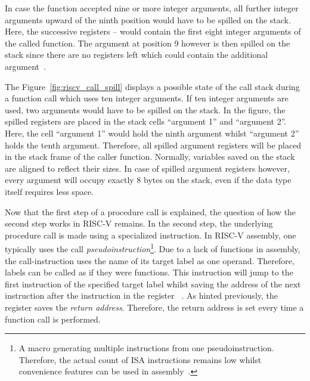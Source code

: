 In case the function accepted nine or more integer arguments,
all further integer arguments upward of the ninth position would have to be spilled on the stack.
Here, the successive registers -- would contain the first eight integer arguments of the called function.
The argument at position 9 however is then spilled on the stack since there are no registers left which could contain the additional argument~\cite[p~.8]{RiscvABI2022}.

The Figure~\ref{fig:riscv_call_spill} displays a possible state of the call stack during a function call which uses ten integer arguments.
If ten integer arguments are used, two arguments would have to be spilled on the stack.
In the figure, the spilled registers are placed in the stack cells \enquote{argument 1} and \enquote{argument 2}.
Here, the cell \enquote{argument 1} would hold the ninth argument whilst \enquote{argument 2} holds the tenth argument.
Therefore, all spilled argument registers will be placed in the stack frame of the caller function.
Normally, variables saved on the stack are aligned to reflect their sizes.
In case of spilled argument registers however, every argument will occupy exactly 8 bytes on the stack, even if the data type itself requires less space.

Now that the first step of a procedure call is explained, the question of how the second step works in RISC-V remains.
In the second step, the underlying procedure call is made using a specialized instruction.
In RISC-V assembly, one typically uses the call \emph{pseudoinstruction}\footnote{A macro generating multiple instructions from one pseudoinstruction. Therefore, the actual count of ISA instructions remains low whilst convenience features can be used in assembly~\cite[p.~68]{Dandamudi2005}.}.
Due to a lack of functions in assembly, the call-instruction uses the name of its target label as one operand.
Therefore, labels can be called as if they were functions.
This instruction will jump to the first instruction of the specified target label whilst saving the address of the next instruction after the  instruction in the register ~\cite[p.~22]{Patterson2017}.
As hinted previously, the  register saves the \emph{return address}.
Therefore, the return address is set every time a function call is performed.

